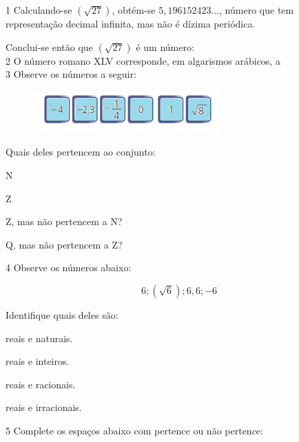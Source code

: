 \num{1} Calculando-se $(\sqrt{27})$, obtém-se $5,196152423$..., número que tem
representação decimal infinita, mas não é dízima periódica.

Conclui-se então que $(\sqrt{27})$ é um número:
\\


\num{2} O número romano XLV corresponde, em algarismos arábicos, a
\\

\num{3} Observe os números a seguir:

\begin{figure}[H]
\centering\includegraphics[width=2.79167in,height=0.63542in]{./imgSAEB_8_MAT/media/image1.png}
\end{figure}

Quais deles pertencem ao conjunto:


\begin{escolha}[itemsep=0pt]
\item N 
\item Z 
\item Z, mas não pertencem a N? 
\item Q, mas não pertencem a Z? 
\end{escolha}

\pagebreak

\num{4} Observe os números abaixo:

$$6; (\sqrt{6}); 6,6; -6$$


Identifique quais deles são:
\begin{escolha}[itemsep=0pt]
\item reais e naturais.
\item reais e inteiros.
\item reais e racionais.
\item reais e irracionais.
\end{escolha}


\num{5} Complete os espaços abaixo com pertence ou não pertence:



